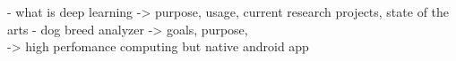 		- what is deep learning -> purpose, usage, current research projects, state of the arts
		- dog breed analyzer -> goals, purpose, \\
		-> high perfomance computing but native android app
	